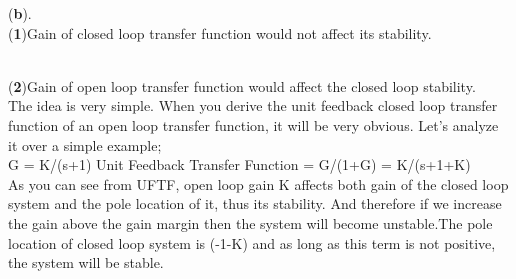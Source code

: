 \begin{enumerate}[label=\thesection.\arabic*.,ref=\thesection.\theenumi]
(\textbf{b}).
\\

(\textbf{1})Gain of closed loop transfer function would not affect its stability.
\\\

(\textbf{2})Gain of open loop transfer function would affect the closed loop stability.
\\

The idea is very simple. When you derive the unit feedback closed loop transfer function of an open loop transfer function, it will be very obvious. Let's analyze it over a simple example;
\\

G = K/(s+1)
Unit Feedback Transfer Function = G/(1+G) = K/(s+1+K)
\\

As you can see from UFTF, open loop gain K affects both gain of the closed loop system and the pole location of it, thus its stability. And therefore if we increase the gain above  the gain margin then the system will become unstable.The pole location of closed loop system is (-1-K) and as long as this term is not positive, the system will be stable.


\end{enumerate}


